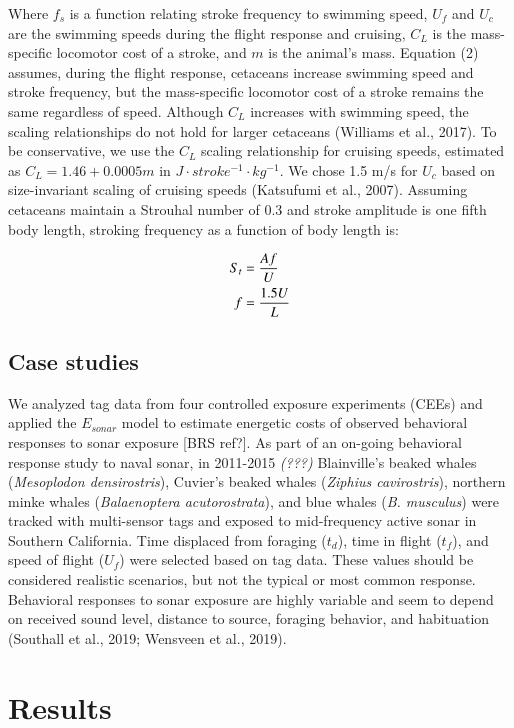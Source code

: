 \documentclass[]{elsarticle} %
\begin{document}
Where \(f_s\) is a function relating stroke frequency to swimming speed,
\(U_f\) and \(U_c\) are the swimming speeds during the flight response
and cruising, \(C_L\) is the mass-specific locomotor cost of a stroke,
and \(m\) is the animal's mass. Equation (2) assumes, during the flight
response, cetaceans increase swimming speed and stroke frequency, but
the mass-specific locomotor cost of a stroke remains the same regardless
of speed. Although \(C_L\) increases with swimming speed, the scaling
relationships do not hold for larger cetaceans (Williams et al., 2017).
To be conservative, we use the \(C_L\) scaling relationship for cruising
speeds, estimated as \(C_L = 1.46 + 0.0005m\) in
\(J \cdot stroke^{-1} \cdot kg^{-1}\). We chose 1.5 m/s for \(U_c\)
based on size-invariant scaling of cruising speeds (Katsufumi et al.,
2007). Assuming cetaceans maintain a Strouhal number of 0.3 and stroke
amplitude is one fifth body length, stroking frequency as a function of
body length is:

\begin{align}
S_t &= \frac{Af}{U} \notag\\
f &= \frac{1.5U}{L}
\end{align}

\subsection{Case studies}\label{case-studies}

We analyzed tag data from four controlled exposure experiments (CEEs)
and applied the \(E_{sonar}\) model to estimate energetic costs of
observed behavioral responses to sonar exposure {[}BRS ref?{]}. As part
of an on-going behavioral response study to naval sonar, in 2011-2015
\emph{(???)} Blainville's beaked whales (\emph{Mesoplodon
densirostris}), Cuvier's beaked whales (\emph{Ziphius cavirostris}),
northern minke whales (\emph{Balaenoptera acutorostrata}), and blue
whales (\emph{B. musculus}) were tracked with multi-sensor tags and
exposed to mid-frequency active sonar in Southern California. Time
displaced from foraging (\(t_d\)), time in flight (\(t_f\)), and speed
of flight (\(U_f\)) were selected based on tag data. These values should
be considered realistic scenarios, but not the typical or most common
response. Behavioral responses to sonar exposure are highly variable and
seem to depend on received sound level, distance to source, foraging
behavior, and habituation (Southall et al., 2019; Wensveen et al.,
2019).

\section{Results}\label{results}
\end{document}
